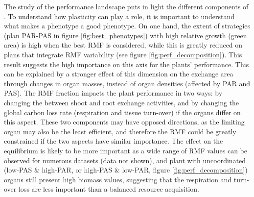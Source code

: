 The study of the performance landscape puts in light the different components of . To understand how plasticity can play a role, it is important to understand what makes a phenotype a good phenotype. 
On one hand, the extent of strategies (plan PAR-PAS in figure \ref{fig:best_phenotypes}) with high relative growth (green area) is high when the best  RMF is considered, while this is greatly reduced on plans that integrate RMF variability (see figure \ref{fig:perf_decomposition}). This result suggests the high importance on this axis for the plants' performance. This can be explained by a stronger effect of this dimension on the exchange area through changes in organ masses, instead of organ densities (affected by PAR and PAS). The RMF fraction impacts the plant performance in two ways: by changing the  between shoot and root exchange activities, and by changing the global carbon loss rate (respiration and tissue turn-over) if the organs differ on this aspect. These two components may have opposed directions, as the limiting organ may also be the least efficient, and therefore the RMF could be greatly constrained if the two aspects have similar importance. The effect on the equilibrium is likely to be more important as a wide range of RMF values can be observed for numerous datasets (data not shown), and plant with uncoordinated (low-PAS \& high-PAR, or high-PAS \& low-PAR, \see figure \ref{fig:perf_decomposition}) organs still present high biomass values, suggesting that the respiration and turn-over loss are less important than a balanced resource acquisition. 


